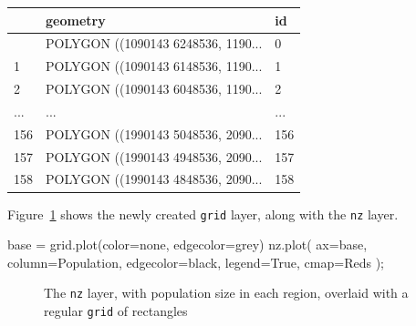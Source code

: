 \documentclass[
  letterpaper,
]{krantz}
\newenvironment{Shaded}{\begin{snugshade}}{\end{snugshade}}
\newcommand{\NormalTok}[1]{\textcolor[rgb]{0.00,0.23,0.31}{#1}}
\newcommand{\OperatorTok}[1]{\textcolor[rgb]{0.37,0.37,0.37}{#1}}
\newcommand{\StringTok}[1]{\textcolor[rgb]{0.13,0.47,0.30}{#1}}
\newcommand{\VariableTok}[1]{\textcolor[rgb]{0.07,0.07,0.07}{#1}}
\begin{document}
\begin{longtable}[]{@{}lll@{}}
\toprule\noalign{}
& geometry & id \\
\midrule\noalign{}
\endhead
\bottomrule\noalign{}
\endlastfoot
0 & POLYGON ((1090143 6248536, 1190... & 0 \\
1 & POLYGON ((1090143 6148536, 1190... & 1 \\
2 & POLYGON ((1090143 6048536, 1190... & 2 \\
... & ... & ... \\
156 & POLYGON ((1990143 5048536, 2090... & 156 \\
157 & POLYGON ((1990143 4948536, 2090... & 157 \\
158 & POLYGON ((1990143 4848536, 2090... & 158 \\
\end{longtable}

Figure~\ref{fig-nz-and-grid} shows the newly created \texttt{grid}
layer, along with the \texttt{nz} layer.

\begin{Shaded}
\begin{Highlighting}[]
\NormalTok{base }\OperatorTok{=}\NormalTok{ grid.plot(color}\OperatorTok{=}\StringTok{\textquotesingle{}none\textquotesingle{}}\NormalTok{, edgecolor}\OperatorTok{=}\StringTok{\textquotesingle{}grey\textquotesingle{}}\NormalTok{)}
\NormalTok{nz.plot(}
\NormalTok{    ax}\OperatorTok{=}\NormalTok{base, }
\NormalTok{    column}\OperatorTok{=}\StringTok{\textquotesingle{}Population\textquotesingle{}}\NormalTok{, }
\NormalTok{    edgecolor}\OperatorTok{=}\StringTok{\textquotesingle{}black\textquotesingle{}}\NormalTok{, }
\NormalTok{    legend}\OperatorTok{=}\VariableTok{True}\NormalTok{, }
\NormalTok{    cmap}\OperatorTok{=}\StringTok{\textquotesingle{}Reds\textquotesingle{}}
\NormalTok{)}\OperatorTok{;}
\end{Highlighting}
\end{Shaded}

\begin{figure}[H]


\caption{\label{fig-nz-and-grid}The \texttt{nz} layer, with population
size in each region, overlaid with a regular \texttt{grid} of
rectangles}

\end{figure}%
\end{document}
